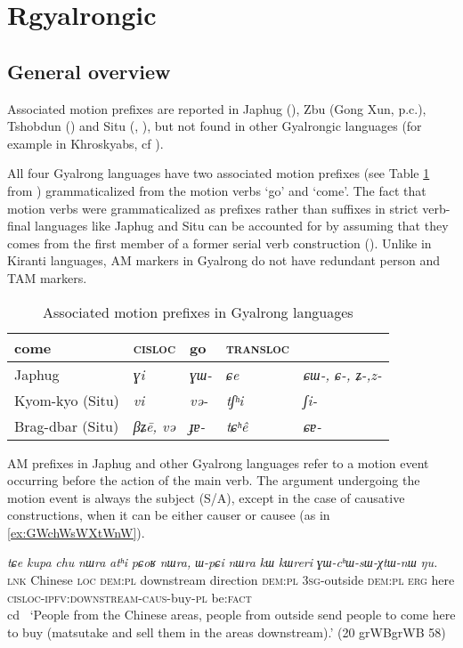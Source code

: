 \documentclass[oneside,a4paper,11pt]{article}
\newcommand{\ipa}[1]{{\phon\textit{#1}}}
\newcommand{\sens}[1]{‘#1’}
\begin{document}
\section{Rgyalrongic}

\subsection{General overview}
Associated motion prefixes are reported in Japhug (\citealt{jacques13harmonization}), Zbu (Gong Xun, p.c.), Tshobdun (\citealt{jackson14morpho}) and Situ (\citealt[200-204]{zhang16bragdbar}, \citealt[497-500]{prins16kyomkyo}), but not found in other Gyalrongic languages (for example in Khroskyabs, cf \citealt{lai17khroskyabs}).

All four Gyalrong languages have two associated motion prefixes (see Table \ref{tab:am-gyalrong} from \citealt[200]{zhang16bragdbar}) grammaticalized from the motion verbs `go' and `come'. The fact that motion verbs were grammaticalized as prefixes rather than suffixes in strict verb-final languages like Japhug and Situ can be accounted for by assuming that they comes from the first member of a former serial verb construction (\citealt{jacques13harmonization}). Unlike in Kiranti languages, AM markers in Gyalrong do not have redundant person and TAM markers.

\begin{table}[H]
\caption{Associated motion prefixes in Gyalrong languages} \centering \label{tab:am-gyalrong}
\begin{tabular}{lllll}
\toprule
come & \textsc{cisloc} & go & \textsc{transloc} \\
\midrule
Japhug &  \ipa{ɣi} &\ipa{ɣɯ-} &\ipa{ɕe} &\ipa{ɕɯ-, ɕ-, ʑ-,z- } \\
Kyom-kyo (Situ) &\ipa{vi} &\ipa{və-} &\ipa{tʃʰi} &\ipa{ʃi-} \\
Brag-dbar (Situ) &\ipa{βʑē, və} &\ipa{ɟɐ-} &\ipa{tɕʰê} &\ipa{ɕɐ-} \\
\bottomrule
\end{tabular}
\end{table}

AM prefixes in Japhug and other Gyalrong languages refer to a motion event occurring before the action of the main verb. The argument undergoing the motion event is always the subject (S/A), except in the case of causative constructions, when it can be either causer or causee (as in \ref{ex:GWchWsWXtWnW}).

\begin{exe}
\ex \label{ex:GWchWsWXtWnW}
\gll
\ipa{tɕe} 	\ipa{kupa} 	\ipa{chu} 	\ipa{nɯra} 	\ipa{atʰi} 	\ipa{pɕoʁ} 	\ipa{nɯra,} 	\ipa{ɯ-pɕi} 	\ipa{nɯra} 	\ipa{kɯ} 	\ipa{kɯreri} 	\ipa{ɣɯ-cʰɯ-sɯ-χtɯ-nɯ} 	\ipa{ŋu.}  \\
\textsc{lnk} Chinese \textsc{loc} \textsc{dem:pl} downstream direction \textsc{dem:pl} \textsc{3sg}-outside  \textsc{dem:pl}  \textsc{erg} here \textsc{cisloc-ipfv:downstream-caus}-buy-\textsc{pl} be:\textsc{fact} \\cd \
\glt \sens{People from the Chinese areas, people from outside send people to come here to buy (matsutake and sell them in the areas downstream).} (20 grWBgrWB 58)
  \end{exe} 
\end{document}
